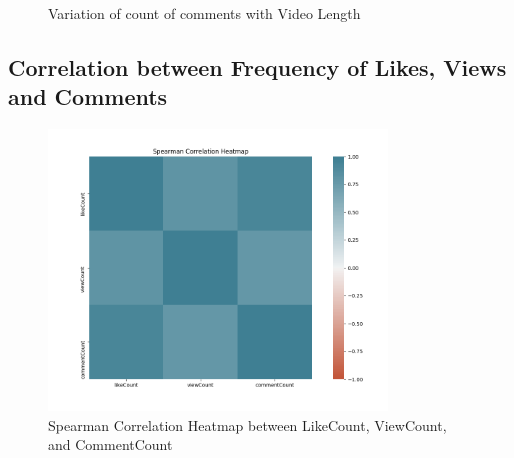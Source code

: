 \documentclass{article}
\begin{document}
\begin{figure}[!htpb]
    \centering
     \hspace{-2em}%
    \qquad
    \\%
    \caption{Variation of count of comments with Video Length}
    \label{fig:comment_video_length}%
\end{figure}
\FloatBarrier
\subsection{Correlation between Frequency of Likes, Views and Comments}
\label{correlation}
\begin{figure}[!htpb]
    \centering
    \includegraphics[width=9cm]{images/correlation_heatmap.png}%
    \caption{Spearman Correlation Heatmap between LikeCount, ViewCount, and CommentCount}
    \label{fig:spearman}%
\end{figure}
\end{document}
